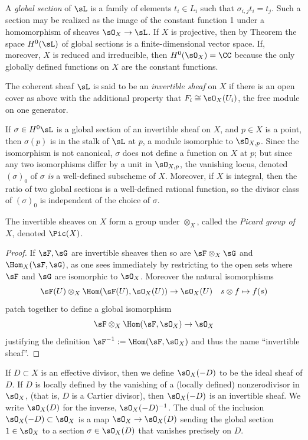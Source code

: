 A \emph{global section} of $\sL$ is a family of elements $t_{i}\in L_{i}$ such that 
$\sigma_{i,j} t_{i} = t_{j}$. Such a section may be realized as the image of the constant function 1 under
a homomorphism of sheaves $\sO_{X} \to \sL$. If $X$ is projective, then 
by Theorem \cite[Thm III.5.2]{H} the space $H^{0}(\sL)$  of global sections is
a finite-dimensional vector space. If, moreover, $X$ is reduced and irreducible, then $H^{0}(\sO_{X}) = \CC$ because the only globally defined
functions on $X$ are the constant functions.

The coherent sheaf $\sL$ is said to be an \emph{invertible sheaf} on $X$ if there is an open cover as above with the additional property
that $F_{i} \cong \sO_X(U_{i})$, the free module on one generator. 

If $\sigma \in H^0\sL$ is a global section of an invertible sheaf
on $X$, and $p\in X$ is a point, then $\sigma(p)$ is in the stalk of $\sL$ at $p$, a module isomorphic to $\sO_{X,p}$. Since the isomorphism is not canonical, $\sigma$ does not define a function on $X$ at $p$; but since any two isomorphisms
differ by a unit in $\sO_{X,p}$, the vanishing locus, denoted $(\sigma)_0$ of $\sigma$ \emph{is} a well-defined subscheme of $X$. Moreover, if $X$ is integral, then the ratio of two global sections is a well-defined rational function, so the divisor class of 
$(\sigma)_0$ is independent of the choice of $\sigma$.

\begin{proposition}
 The invertible sheaves on $X$ form a group under $\otimes_{X}$, called the 
\emph{Picard group of $X$}, denoted $\Pic(X)$. 
\end{proposition}
\begin{proof}
 If $\sF, \sG$ are invertible sheaves then so are $\sF\otimes_{X}\sG$ and  $\Hom_{X}(\sF, \sG)$, as one sees immediately by
restricting to the open sets where $\sF$ and $\sG$ are isomorphic to $\sO_{X}$. Moreover the natural isomorphisms
$$
\sF(U) \otimes_{X} \Hom(\sF(U), \sO_{X}(U)) \to \sO_{X}(U)\quad s \otimes f \mapsto f(s)
$$ 
patch together to define a global isomorphism 
$$
\sF \otimes_{X} \Hom(\sF, \sO_{X}) \to \sO_{X}
$$
justifying the definition
$\sF^{-1} := \Hom(\sF, \sO_{X})$ and thus the name ``invertible sheaf''. 
\end{proof}
 
If $D\subset X$ is an effective divisor, then we define $\sO_{X}(-D)$ to be the ideal sheaf of $D$. If $D$ is locally defined by the vanishing of a (locally defined) nonzerodivisor in $\sO_{X}$, (that is, $D$ is a Cartier divisor), then
$\sO_{X}(-D)$ is an invertible
sheaf.
We write $\sO_{X}(D)$ for the inverse, $\sO_{X}(-D)^{-1}$. The dual of the inclusion
$\sO_{X}(-D)\subset \sO_{X}$ is a map $\sO_{X} \to \sO_{X}(D)$ sending the global section $1\in \sO_{X}$ to a section
$\sigma\in \sO_{X}(D)$ that vanishes precisely on $D$.

